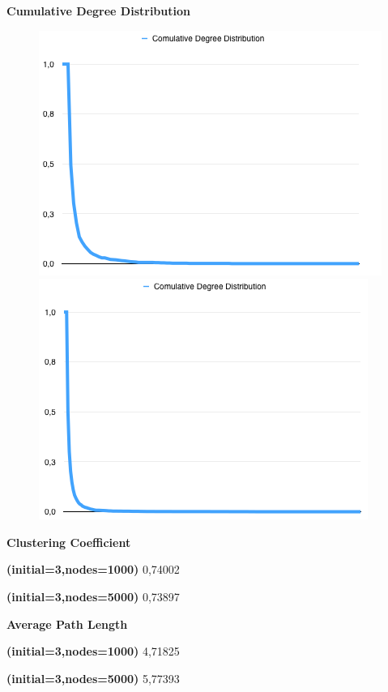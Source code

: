 \documentclass[a4paper,titlepage,11pt]{article}
\begin{document}
\textbf{Cumulative Degree Distribution}

\begin{figure}[h]
    \centering
    \includegraphics[scale=0.50]{img/cdd-minimal-3-1000.png}
    \includegraphics[scale=0.50]{img/cdd-minimal-3-5000.png}
\end{figure}

\begin{multicols}{2}

  \textbf{Clustering Coefficient}

  \textbf{(initial=3,nodes=1000)} 0,74002

  \textbf{(initial=3,nodes=5000)} 0,73897

\columnbreak

  \textbf{Average Path Length}

  \textbf{(initial=3,nodes=1000)} 4,71825

  \textbf{(initial=3,nodes=5000)} 5,77393

\end{multicols}
\end{document}
